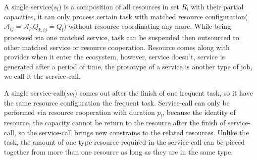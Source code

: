 A single service($s_l$) is a composition of all resources in set $R_l$ with their partial capacities, it can only process certain task with matched resource configuration($\mathcal{A}_{ij}=\mathcal{A}_l$,$Q_{k,ij}=Q_l$) without resource coordinating any more. While being processed via one matched service, task can be suspended then outsourced to other matched service or resource cooperation.
Resource comes along with provider when it enter the ecosystem, however, service doesn't, service is generated after a period of time, the prototype of a service is another type of job, we call it the service-call.

A single service-call($sc_l$) comes out after the finish of one frequent task, so it have the same resource configuration the frequent task. Service-call can only be performed via resource cooperation with duration $p_l$, because the identity of resource, the capacity cannot be return to the resource after the finish of service-call, so the service-call brings new constrains to the related resources. Unlike the task, the amount of one type resource required in the service-call can be pieced together from more than one resource as long as they are in the same type.

